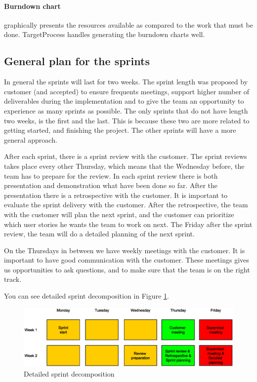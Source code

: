 \paragraph{Burndown chart} graphically presents the resources available as compared to the work that must be done. TargetProcess handles generating the burndown charts well.


\subsection{General plan for the sprints}
In general the sprints will last for two weeks. The sprint length was proposed by customer (and accepted) to ensure frequents meetings, support higher number of deliverables during the implementation and to give the team an opportunity to experience as many sprints as possible. The only sprints that do not have length two weeks, is the first and the last. This is because these two are more related to getting started, and finishing the project. The other sprints will have a more general approach. 

After each sprint, there is a sprint review with the customer. The sprint reviews takes place every other Thursday, which means that the Wednesday before, the team has to prepare for the review. In each sprint review there is both presentation and demonstration what have been done so far. After the presentation there is a retrospective with the customer. 
It is important to evaluate the sprint delivery with the customer. 
After the retrospective, the team with the customer will plan the next sprint, and the customer can prioritize which user stories he wants the team to work on next. 
The Friday after the sprint review, the team will do a detailed planning of the next sprint.

On the Thursdays in between we have weekly meetings with the customer. It is important to have good communication with the customer. These meetings gives us opportunities to ask questions, and to make sure that the team is on the right track.

You can see detailed sprint decomposition in Figure \ref{img:sprint_detail}.
\begin{figure}[h!]
    \begin{center}
    \includegraphics[width=16.2cm]{images/sprint_detail.eps}
    \caption{Detailed sprint decomposition}
    \label{img:sprint_detail}
    \end{center}
\end{figure}



